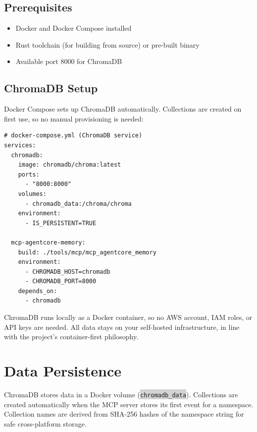 \documentclass[11pt,letterpaper]{article}
\newcommand{\code}[1]{\texttt{\small\colorbox{lightgray}{#1}}}
\begin{document}
\subsection{Prerequisites}

\begin{keybox}
\begin{itemize}
  \item Docker and Docker Compose installed
  \item Rust toolchain (for building from source) or pre-built binary
  \item Available port 8000 for ChromaDB
\end{itemize}
\end{keybox}

\subsection{ChromaDB Setup}

Docker Compose sets up ChromaDB automatically. Collections are created on first use, so no manual provisioning is needed:

\begin{lstlisting}[caption={ChromaDB setup via Docker Compose}, language={}]
# docker-compose.yml (ChromaDB service)
services:
  chromadb:
    image: chromadb/chroma:latest
    ports:
      - "8000:8000"
    volumes:
      - chromadb_data:/chroma/chroma
    environment:
      - IS_PERSISTENT=TRUE

  mcp-agentcore-memory:
    build: ./tools/mcp/mcp_agentcore_memory
    environment:
      - CHROMADB_HOST=chromadb
      - CHROMADB_PORT=8000
    depends_on:
      - chromadb
\end{lstlisting}

\begin{infobox}
ChromaDB runs locally as a Docker container, so no AWS account, IAM roles, or API keys are needed. All data stays on your self-hosted infrastructure, in line with the project's container-first philosophy.
\end{infobox}

\section{Data Persistence}

ChromaDB stores data in a Docker volume (\code{chromadb\_data}). Collections are created automatically when the MCP server stores its first event for a namespace. Collection names are derived from SHA-256 hashes of the namespace string for safe cross-platform storage.
\end{document}

